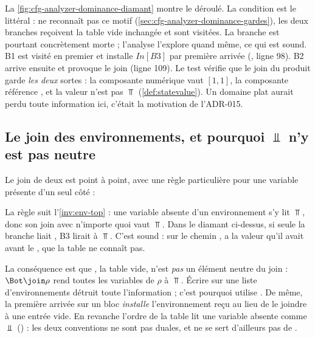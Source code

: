 La \cref{fig:cfg-analyzer-dominance-diamant} montre le déroulé. La condition
est le littéral  :  ne reconnaît pas ce
motif (\cref{sec:cfg-analyzer-dominance-gardes}), les deux branches reçoivent
la table vide inchangée et sont visitées. La branche  est pourtant
concrètement morte ; l'analyse l'explore quand même, ce qui est sound. B1 est
visité en premier et installe $\mathit{In}[B3]$ par \og première
arrivée\fg{} (, ligne 98). B2 arrive ensuite et
provoque le join (ligne 109). Le test vérifie que le join du produit
 garde \emph{les deux} sortes : la composante numérique vaut
$[1,1]$, la composante référence , et la valeur n'est pas
$\Top$ (\cref{def:statevalue}). Un domaine plat aurait perdu toute information
ici, c'était la motivation de l'ADR-015.

\subsection{Le join des environnements, et pourquoi $\Bot$ n'y est pas neutre}

Le join de deux  est point à point, avec une règle
particulière pour une variable présente d'un seul côté :


La règle suit l'\cref{inv:env-top} : une variable absente d'un environnement
s'y lit $\Top$, donc son join avec n'importe quoi vaut $\Top$. Dans le diamant
ci-dessus, si seule la branche  liait , B3 lirait
 à $\Top$. C'est sound : sur le chemin ,  a la
valeur qu'il avait avant le , que la table ne connaît pas.

\begin{piege}
  La conséquence est que , la table vide, n'est
  \emph{pas} un élément neutre du join : $\Bot \join \rho$ rend toutes les
  variables de $\rho$ à $\Top$. Écrire 
  sur une liste d'environnements détruit toute l'information ; c'est pourquoi
   utilise . De même, la première arrivée sur un
  bloc \emph{installe} l'environnement reçu au lieu de le joindre à une
  entrée vide. En revanche l'ordre  de la table lit une variable
  absente comme $\Bot$ () :
  les deux conventions ne sont pas duales, et  ne se sert
  d'ailleurs pas de .
\end{piege}

